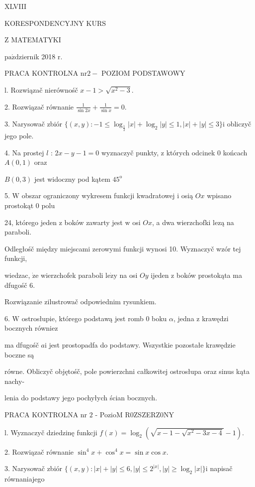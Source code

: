 \documentclass[a4paper,12pt]{article}
\begin{document}
XLVIII

KORESPONDENCYJNY KURS

Z MATEMATYKI

$\mathrm{p}\mathrm{a}\acute{\mathrm{z}}$dziernik 2018 $\mathrm{r}.$

PRACA KONTROLNA $\mathrm{n}\mathrm{r} 2-$ POZIOM PODSTAWOWY

l. Rozwiązač nierównośč $x-1>\sqrt{x^{2}-3}.$

2. Rozwiązač równanie $\displaystyle \frac{1}{\sin 2x}+\frac{1}{\sin x}=0.$

3. Narysowač zbiór $\{(x,y):-1\leq\log_{\frac{1}{2}}|x|+\log_{2}|y|\leq 1,|x|+|y|\leq 3\}\mathrm{i}$ obliczyč jego pole.

4. Na prostej $l$ : $2x-y-1=0$ wyznaczyč punkty, $\mathrm{z}$ których odcinek $0$ końcach $A(0,1)$ oraz

$B(0,3)$ jest widoczny pod kątem $45^{\mathrm{o}}$

5. $\mathrm{W}$ obszar ograniczony wykresem funkcji kwadratowej $\mathrm{i}$ osią $Ox$ wpisano prostokąt $0$ polu

24, którego jeden $\mathrm{z}$ boków zawarty jest $\mathrm{w}$ osi $Ox$, a dwa wierzchofki lezą na paraboli.

Odległośč między miejscami zerowymi funkcji wynosi 10. Wyznaczyč wzór tej funkcji,

wiedzac, $\dot{\mathrm{z}}\mathrm{e}$ wierzchofek paraboli $\mathrm{l}\mathrm{e}\dot{\mathrm{z}}\mathrm{y}$ na osi $Oy$ ijeden $\mathrm{z}$ boków prostokąta ma dfugośč 6.

Rozwiązanie zilustrowač odpowiednim rysunkiem.

6. $\mathrm{W}$ ostrosłupie, którego podstawą jest romb $0$ boku $\alpha$, jedna $\mathrm{z}$ krawędzi bocznych równiez

ma dfugośč $a\mathrm{i}$ jest prostopadfa do podstawy. Wszystkie pozostałe krawędzie boczne są

równe. Obliczyč objętośč, pole powierzchni całkowitej ostrosłupa oraz sinus kąta nachy-

lenia do podstawy jego pochyłych ścian bocznych.




PRACA KONTROLNA nr $2$ - PozioM R0ZSZERZ0NY

l. Wyznaczyč dziedzinę funkcji $f(x)=\log_{2}(\sqrt{x-1-\sqrt{x^{2}-3x-4}}-1).$

2. Rozwiązač równanie $\sin^{4}x+\cos^{4}x=\sin x\cos x.$

3. Narysowač zbiór $\{(x,y):|x|+|y|\leq 6,|y|\leq 2^{|x|},|y|\geq\log_{2}|x|\}\mathrm{i}$ napisač równaniajego
\end{document}
